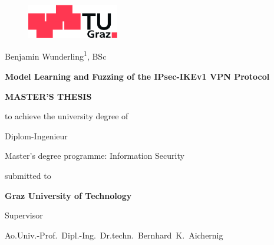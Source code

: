 \begin{titlepage}
\begin{center}
\begin{figure}[!ht]
\centerline{\includegraphics[width=4cm,keepaspectratio=true]{images/tug}}
\end{figure}	
	
\vspace*{28mm}

{\LARGE Benjamin Wunderling\textsuperscript{1}, BSc}\\

\vspace{16mm}

{\LARGE \bf  Model Learning and Fuzzing of the IPsec-IKEv1 VPN Protocol\\}

\vspace{16mm}

{\Large \bf MASTER'S THESIS}\\

\vspace{6mm}

{\large to achieve the university degree of}

\vspace{4mm}

{\large Diplom-Ingenieur}

\vspace{4mm}

{\large Master's degree programme: Information Security}

\vspace{16mm}

{\large submitted to}

\vspace{4mm}

{\large \bf Graz University of Technology}

\vspace{16mm}

{\large Supervisor}

\vspace{4mm}

{\large Ao.Univ.-Prof.\ Dipl.-Ing.\ Dr.techn.\ Bernhard\ K.\ Aichernig}

\vspace{4mm}


\end{center}
\end{titlepage}

